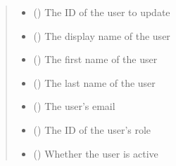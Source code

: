 \documentclass[letterpaper,10pt,english]{sphinxmanual}
\begin{document}
\begin{fulllineitems}
\begin{fulllineitems}
\begin{sphinxVerbatim}[commandchars=\\\{\}]
 
  
\end{sphinxVerbatim}
\begin{quote}\begin{description}
\begin{itemize}
\item {} 
\sphinxAtStartPar
{} () \textendash{} The ID of the user to update

\item {} 
\sphinxAtStartPar
{} () \textendash{} The display name of the user

\item {} 
\sphinxAtStartPar
{} () \textendash{} The first name of the user

\item {} 
\sphinxAtStartPar
{} () \textendash{} The last name of the user

\item {} 
\sphinxAtStartPar
{} () \textendash{} The user’s email

\item {} 
\sphinxAtStartPar
{} () \textendash{} The ID of the user’s role

\item {} 
\sphinxAtStartPar
{} (\sphinxstyleliteralemphasis{\sphinxupquote{ (}}\sphinxstyleliteralemphasis{\sphinxupquote{)}}) \textendash{} Whether the user is active


\end{itemize}
\end{description}
\end{quote}
\end{fulllineitems}
\end{fulllineitems}
\end{document}
